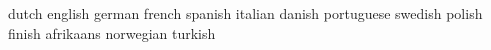 \startinterface dutch      \appendtoks \language[\s!nl]\to \everyjob \stopinterface
\startinterface english    \appendtoks \language[\s!en]\to \everyjob \stopinterface
\startinterface german     \appendtoks \language[\s!de]\to \everyjob \stopinterface
\startinterface french     \appendtoks \language[\s!fr]\to \everyjob \stopinterface
\startinterface spanish    \appendtoks \language[\s!sp]\to \everyjob \stopinterface
\startinterface italian    \appendtoks \language[\s!it]\to \everyjob \stopinterface
\startinterface danish     \appendtoks \language[\s!da]\to \everyjob \stopinterface
\startinterface portuguese \appendtoks \language[\s!pt]\to \everyjob \stopinterface
\startinterface swedish    \appendtoks \language[\s!sv]\to \everyjob \stopinterface
\startinterface polish     \appendtoks \language[\s!pl]\to \everyjob \stopinterface
\startinterface finish     \appendtoks \language[\s!fi]\to \everyjob \stopinterface
\startinterface afrikaans  \appendtoks \language[\s!af]\to \everyjob \stopinterface
\startinterface norwegian  \appendtoks \language[\s!no]\to \everyjob \stopinterface
\startinterface turkish    \appendtoks \language[\s!tr]\to \everyjob \stopinterface

\appendtoks \mainlanguage[\currentlanguage] \to \everyjob

\protect

\endinput
